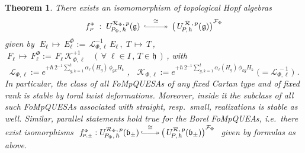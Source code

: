 \documentclass[12pt,reqno,twoside,a4paper]{amsart}
\numberwithin{equation}{section}
\newtheorem{theorem}[lema]{Theorem}
\theoremstyle{definition}
\newtheorem{free text}[lema]{}
\theoremstyle{remark}
\newcommand{\R}{{\mathcal R}}
\newcommand{\F}{{\mathcal F}}
\def \K {\mathcal{K}}
\def \L {\mathcal{L}}
\def \lieg{\mathfrak{g}}
\def \lieb{\mathfrak{b}}
\def \lieh{\mathfrak{h}}
\def \uRpPhg{U^{\,\R\,,\,p}_{\!P,\hskip0,7pt\hbar}(\hskip0,5pt\lieg)}
\theoremstyle{plain}
\begin{document}
\begin{theorem}  \label{thm: twist-uRpPhg=new-uRpPhg}
%
 There exists an isomomorphism of topological Hopf algebras
%
  $$  f^{\scriptscriptstyle \Phi}_{\scriptscriptstyle P} \; :
   \; U_{\!P_\Phi,\,\hbar}^{\R_{\scriptscriptstyle \Phi},\,p}(\lieg)  \,\; {\buildrel \cong \over
   {\lhook\joinrel\relbar\joinrel\relbar\joinrel\relbar\joinrel\twoheadrightarrow}} \;\,
   {\big(\, \uRpPhg\big)}^{\F_\Phi}  $$
%
 given by
%
  $ \; E_\ell \, \mapsto \, E^{\scriptscriptstyle \Phi}_\ell := \, \L_{\Phi, \ell}^{-1} \, E_\ell \, , \; T \, \mapsto \, T \, $,  $ \; F_\ell \, \mapsto \, F^{\scriptscriptstyle \Phi}_\ell := \, F_\ell \, \K_{\Phi, \ell}^{+1}  \;\;\;  (\, \forall \; \ell \in I \, , \, T \in \lieh \,) \, $,
%
 \;with
%
 $ \;\; \L_{\Phi, \ell} := e^{+ \hbar \, 2^{-1} \sum_{g,k=1}^t \alpha_\ell(H_g) \, \phi_{gk} H_k} \; $,
%
 $ \;\; \K_{\Phi,\ell} := e^{+ \hbar \, 2^{-1} \sum_{g,k=1}^t \alpha_\ell(H_g) \, \phi_{kg} H_k} \; \big(\! = \L_{\Phi, \ell}^{\,-1} \,\big) \; $.
%
 \vskip3pt
%
   In particular, the class of all FoMpQUESAs of any fixed Cartan type and of fixed rank
%
%
 is stable by toral twist deformations.  Moreover, inside it the subclass of all such
 FoMpQUESAs associated with  \textsl{straight},  resp.\  \textsl{small},  realizations is stable as well.
%
 \vskip3pt
%
   Similar, parallel statements hold true for the Borel FoMpQUEAs, i.e.\ there exist isomorphisms
 $ \; f^{\scriptscriptstyle \Phi}_{\!\scriptscriptstyle P,\pm} :
   U_{\!P_\Phi,\,\hbar}^{\R_{\scriptscriptstyle \Phi},\,p}(\lieb_\pm) \, {\buildrel \cong \over
   {\lhook\joinrel\relbar\joinrel\relbar\joinrel\twoheadrightarrow}} \,
   {\big(\, U_{\!P,\,\hbar}^{\R,\,p}(\lieb_\pm)\big)}^{\F_\Phi} \; $
 given by formulas as above.
%
\end{theorem}
\end{document}
